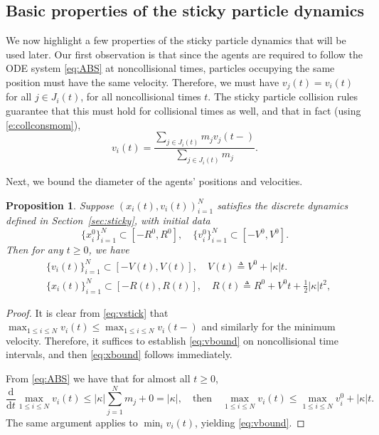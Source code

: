 \documentclass[11pt,reqno]{amsart}
\newtheorem{proposition}[theorem]{Proposition}
\theoremstyle{definition}
\theoremstyle{remark}
\def\dd{\mathrm{d}}
\begin{document}
	\subsection{Basic properties of the sticky particle dynamics}
	
	\label{sec:stickyprops} We now highlight a few properties of the sticky particle dynamics that will be used later.  Our first observation is that since the agents are required to follow the ODE system \eqref{eq:ABS} at noncollisional times, particles occupying the same position must have the same velocity. Therefore, we must have $v_j(t) = v_i(t)$ for all $j\in J_i(t)$, for all noncollisional times $t$.  The sticky particle collision rules guarantee that this must hold for collisional times as well, and that in fact (using \eqref{e:collconsmom}),
	\begin{equation}
		\label{eq:vstick}
		v_i(t) = \frac{\sum_{j\in J_i(t)} m_j v_j(t-)}{\sum_{j\in J_i(t)} m_j}.
	\end{equation}
	
	Next, we bound the diameter of the agents' positions and velocities.
	\begin{proposition}\label{prop:xvbound}
		Suppose $(x_i(t),v_i(t))_{i=1}^N$ satisfies the discrete dynamics defined in Section~\ref{sec:sticky}, with initial data
		\[
		\{x_i^0\}_{i=1}^N\subset [-R^0,R^0],\quad \{v_i^0\}_{i=1}^N\subset [-V^0,V^0].
		\]
		Then for any $t\geq0$, we have
		\begin{align}
			& \{v_i(t)\}_{i=1}^N\subset [-V(t),V(t)],\quad V(t) \triangleq V^0 + |\kappa| t. \label{eq:vbound} \\
			& \{x_i(t)\}_{i=1}^N\subset [-R(t),R(t)],\quad R(t) \triangleq R^0 + V^0t +\tfrac12|\kappa| t^2,\label{eq:xbound}
		\end{align}
	\end{proposition}
	\begin{proof}
		It is clear from \eqref{eq:vstick} that $\max_{1\leq i\leq N} v_i(t) \le \max_{1\leq i\leq N} v_i(t-)$ and similarly for the minimum velocity.  Therefore, it suffices to establish \eqref{eq:vbound} on noncollisional time intervals, and then \eqref{eq:xbound} follows immediately.
		
		From \eqref{eq:ABS} we have that for almost all $t\geq0$, 
		\[
		\frac{\dd}{\dd t} \max_{1\leq i\leq N} v_i(t)\leq |\kappa| \sum_{j=1}^N m_j +0 = |\kappa|,\quad\text{then}\quad 
		\max_{1\leq i\leq N} v_i(t)\leq \max_{1\leq i\leq N} v_i^0+|\kappa| t.
		\]
		The same argument applies to $\min_i v_i(t)$, yielding \eqref{eq:vbound}.
	\end{proof}
	
\end{document}
